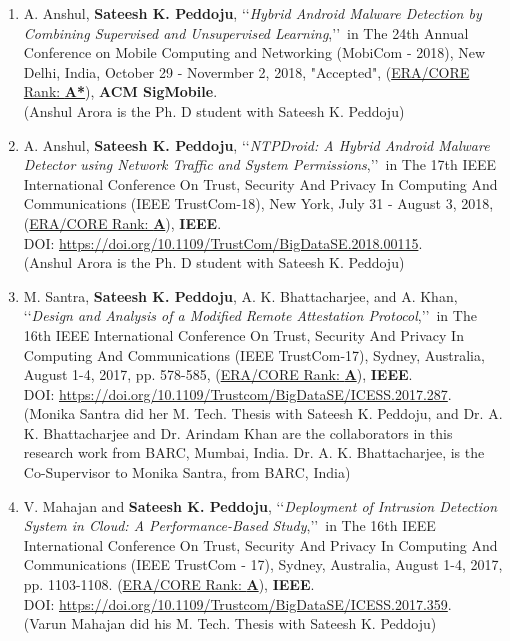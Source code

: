 \begin{enumerate}%

		\item
	A. Anshul, \textbf{Sateesh K. Peddoju}, \lq\lq \textit{Hybrid Android Malware Detection by Combining Supervised and Unsupervised Learning},\rq\rq\, in The 24th Annual Conference on Mobile Computing and Networking (MobiCom - 2018), New Delhi, India, October 29 - Novermber 2, 2018, "Accepted", (\underline{ERA/CORE Rank: \textbf{A*}}), \textbf{ACM SigMobile}. \\ (Anshul Arora is the Ph. D student with Sateesh K. Peddoju)

	
	\item
	A. Anshul, \textbf{Sateesh K. Peddoju}, \lq\lq \textit{NTPDroid: A Hybrid Android Malware Detector using Network Traffic and System Permissions},\rq\rq\, in The 17th IEEE International Conference On Trust, Security And Privacy In Computing And Communications (IEEE TrustCom-18), New York, July 31 - August 3, 2018, (\underline{ERA/CORE Rank: \textbf{A}}), \textbf{IEEE}. \\DOI: \url{https://doi.org/10.1109/TrustCom/BigDataSE.2018.00115}. \\ (Anshul Arora is the Ph. D student with Sateesh K. Peddoju)
	
	\item
	M. Santra, \textbf{Sateesh K. Peddoju}, A. K. Bhattacharjee, and A. Khan, \lq\lq \textit{Design and Analysis of a Modified Remote Attestation Protocol},\rq\rq\, in The 16th IEEE International Conference On Trust, Security And Privacy In Computing And Communications (IEEE TrustCom-17), Sydney, Australia, August 1-4, 2017,  pp. 578-585, (\underline{ERA/CORE Rank: \textbf{A}}), \textbf{IEEE}. \\DOI: \url{https://doi.org/10.1109/Trustcom/BigDataSE/ICESS.2017.287}.	\\(Monika Santra did her M. Tech. Thesis with Sateesh K. Peddoju, and Dr. A. K. Bhattacharjee and Dr. Arindam Khan are the collaborators in this research work from BARC, Mumbai, India. Dr. A. K. Bhattacharjee, is the Co-Supervisor to Monika Santra, from BARC, India)

		
	\item
	V. Mahajan and \textbf{Sateesh K. Peddoju}, \lq\lq \textit{Deployment of Intrusion Detection System in Cloud: A Performance-Based Study},\rq\rq\,  in The 16th IEEE International Conference On Trust, Security And Privacy In Computing And Communications (IEEE TrustCom - 17), Sydney, Australia, August 1-4, 2017,  pp. 1103-1108. (\underline{ERA/CORE Rank: \textbf{A}}), \textbf{IEEE}. \\ DOI: \url{https://doi.org/10.1109/Trustcom/BigDataSE/ICESS.2017.359}. \\(Varun Mahajan did his M. Tech. Thesis with Sateesh K. Peddoju)


\end{enumerate}
